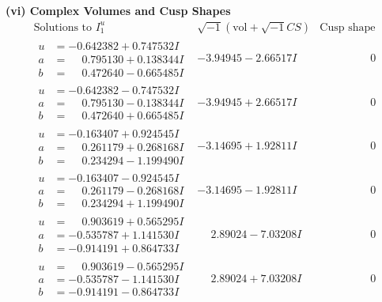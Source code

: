 \documentclass[1p]{elsarticle_modified}
\theoremstyle{definition}
\newcommand{\I}{\sqrt{-1}}
\begin{document}
\newpage\flushleft \textbf{(vi) Complex Volumes and Cusp Shapes}
$$\begin{array}{c|c|c}  
\text{Solutions to }I^u_{1}& \I (\text{vol} + \sqrt{-1}CS) & \text{Cusp shape}\\
 \hline 
\begin{aligned}
u &= -0.642382 + 0.747532 I \\
a &= \phantom{-}0.795130 + 0.138344 I \\
b &= \phantom{-}0.472640 - 0.665485 I\end{aligned}
 & -3.94945 - 2.66517 I & \phantom{-0.000000 } 0 \\ \hline\begin{aligned}
u &= -0.642382 - 0.747532 I \\
a &= \phantom{-}0.795130 - 0.138344 I \\
b &= \phantom{-}0.472640 + 0.665485 I\end{aligned}
 & -3.94945 + 2.66517 I & \phantom{-0.000000 } 0 \\ \hline\begin{aligned}
u &= -0.163407 + 0.924545 I \\
a &= \phantom{-}0.261179 + 0.268168 I \\
b &= \phantom{-}0.234294 - 1.199490 I\end{aligned}
 & -3.14695 + 1.92811 I & \phantom{-0.000000 } 0 \\ \hline\begin{aligned}
u &= -0.163407 - 0.924545 I \\
a &= \phantom{-}0.261179 - 0.268168 I \\
b &= \phantom{-}0.234294 + 1.199490 I\end{aligned}
 & -3.14695 - 1.92811 I & \phantom{-0.000000 } 0 \\ \hline\begin{aligned}
u &= \phantom{-}0.903619 + 0.565295 I \\
a &= -0.535787 + 1.141530 I \\
b &= -0.914191 + 0.864733 I\end{aligned}
 & \phantom{-}2.89024 - 7.03208 I & \phantom{-0.000000 } 0 \\ \hline\begin{aligned}
u &= \phantom{-}0.903619 - 0.565295 I \\
a &= -0.535787 - 1.141530 I \\
b &= -0.914191 - 0.864733 I\end{aligned}
 & \phantom{-}2.89024 + 7.03208 I & \phantom{-0.000000 } 0 \\ \hline\begin{aligned}

\end{aligned}
\end{array}$$
\end{document}
